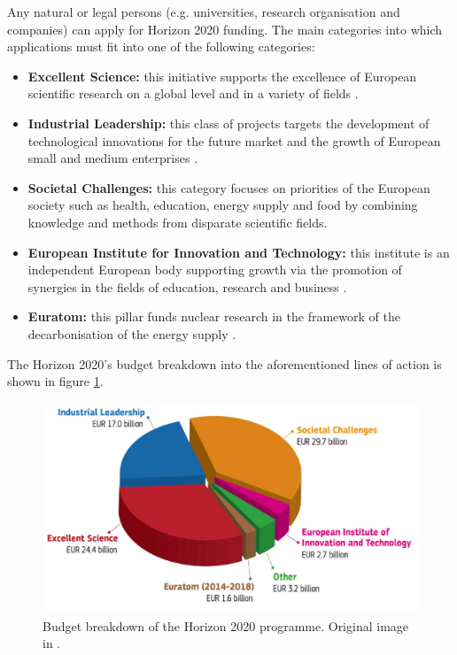 Any natural or legal persons (e.g. universities, research organisation and companies) can apply for Horizon 2020 funding. The main categories into which applications must fit into one of the following categories: 

\begin{itemize}
 \item \textbf{Excellent Science:} this initiative supports the excellence of European scientific research on a global level and in a variety of fields \cite{ExcellentScience}.
 \item \textbf{Industrial Leadership:} this class of projects targets the development of technological innovations for the future market and the growth of European small and medium enterprises \cite{IndustrialLeadership}.
 \item \textbf{Societal Challenges:} this category focuses on priorities of the European society such as health, education, energy supply and food by combining knowledge and methods from disparate scientific fields\cite{SocietalChallenges}.  
 \item \textbf{European Institute for Innovation and Technology:} this institute is an independent European body supporting growth via the promotion of synergies in the fields of education, research and business \cite{EIT}. 
 \item \textbf{Euratom:} this pillar funds nuclear research in the framework of the decarbonisation of the energy supply \cite{Euratom}.
\end{itemize}
The Horizon 2020's budget breakdown into the aforementioned lines of action is shown in figure \ref{H2020_budget_breakdown}.

\begin{figure}[!t] 
 \begin{center}
 \includegraphics[scale=0.3]{Images/H2020_budget_breakdown.png}
 \caption{Budget breakdown of the Horizon 2020 programme. Original image in \cite{H2020Budget}.}
 \label{H2020_budget_breakdown}
 \end{center}
\end{figure}

